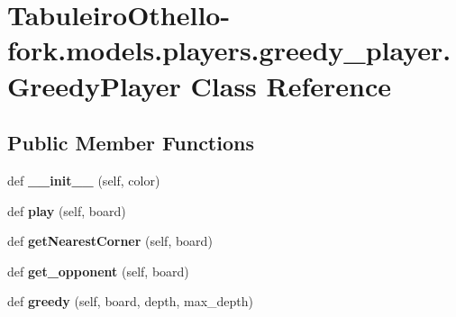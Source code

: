 \hypertarget{class_tabuleiro_othello-fork_1_1models_1_1players_1_1greedy__player_1_1_greedy_player}{}\section{Tabuleiro\+Othello-\/fork.models.\+players.\+greedy\+\_\+player.\+Greedy\+Player Class Reference}
\label{class_tabuleiro_othello-fork_1_1models_1_1players_1_1greedy__player_1_1_greedy_player}
\subsection*{Public Member Functions}
\begin{DoxyCompactItemize}
\item 
\hypertarget{class_tabuleiro_othello-fork_1_1models_1_1players_1_1greedy__player_1_1_greedy_player_a03ac585448cfbfbee64e1b1f87f8dafa}{}def {\bfseries \+\_\+\+\_\+init\+\_\+\+\_\+} (self, color)\label{class_tabuleiro_othello-fork_1_1models_1_1players_1_1greedy__player_1_1_greedy_player_a03ac585448cfbfbee64e1b1f87f8dafa}

\item 
\hypertarget{class_tabuleiro_othello-fork_1_1models_1_1players_1_1greedy__player_1_1_greedy_player_a5d2b6f2dd3e767562a5fd8b3dec46495}{}def {\bfseries play} (self, board)\label{class_tabuleiro_othello-fork_1_1models_1_1players_1_1greedy__player_1_1_greedy_player_a5d2b6f2dd3e767562a5fd8b3dec46495}

\item 
\hypertarget{class_tabuleiro_othello-fork_1_1models_1_1players_1_1greedy__player_1_1_greedy_player_a39e596aceb3f7c6f925a41ec8d6ddbd5}{}def {\bfseries get\+Nearest\+Corner} (self, board)\label{class_tabuleiro_othello-fork_1_1models_1_1players_1_1greedy__player_1_1_greedy_player_a39e596aceb3f7c6f925a41ec8d6ddbd5}

\item 
\hypertarget{class_tabuleiro_othello-fork_1_1models_1_1players_1_1greedy__player_1_1_greedy_player_a3fd9937ec4167e94f49f015a6beabc3f}{}def {\bfseries get\+\_\+opponent} (self, board)\label{class_tabuleiro_othello-fork_1_1models_1_1players_1_1greedy__player_1_1_greedy_player_a3fd9937ec4167e94f49f015a6beabc3f}

\item 
\hypertarget{class_tabuleiro_othello-fork_1_1models_1_1players_1_1greedy__player_1_1_greedy_player_ac692da8fa3ba9364ae4a896320f02903}{}def {\bfseries greedy} (self, board, depth, max\+\_\+depth)\label{class_tabuleiro_othello-fork_1_1models_1_1players_1_1greedy__player_1_1_greedy_player_ac692da8fa3ba9364ae4a896320f02903}

\end{DoxyCompactItemize}
